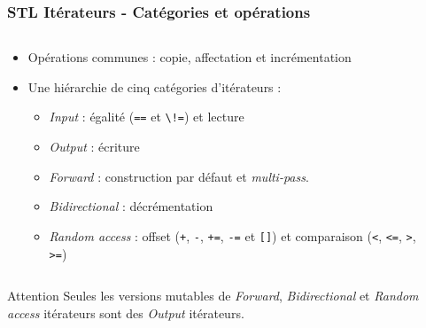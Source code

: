 \documentclass[C++.tex]{subfiles}
\begin{document}
\begin{frame}
	\frametitle{STL Itérateurs - Catégories et opérations}
	\begin{columns}[T]
		\begin{column}{0.80\textwidth}
			\begin{itemize}
				\item Opérations communes : copie, affectation et incrémentation
				\item Une hiérarchie de cinq catégories d'itérateurs :
				\begin{itemize}
					\item \textit{Input} : égalité (\lstinline|==| et \lstinline|\!=|) et lecture
					\item \textit{Output} : écriture
					\item \textit{Forward} : construction par défaut et \og \textit{multi-pass}\fg{}.


					\item \textit{Bidirectional} : décrémentation
					\item \textit{Random access} : offset (\lstinline|+|, \lstinline|-|, \lstinline|+=|, \lstinline|-=| et \lstinline|[]|) et comparaison (\lstinline|<|, \lstinline|<=|, \lstinline|>|, \lstinline|>=|)
				\end{itemize}
			\end{itemize}
		\end{column}

		\begin{column}{0.20\textwidth}
			\centering
		\end{column}
	\end{columns}

	\begin{alertblock}{Attention}
		Seules les versions mutables de \textit{Forward}, \textit{Bidirectional} et \textit{Random access} itérateurs sont des \textit{Output} itérateurs.
	\end{alertblock}
\end{frame}
\end{document}
